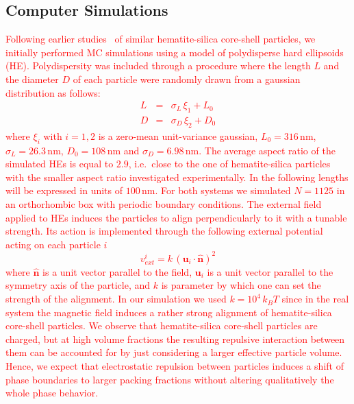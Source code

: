 \documentclass[aps,prl,preprint,superscriptaddress]{revtex4-1} %
\def\nm{\,\si{\nano\meter}}%
\begin{document}
\subsection{Computer Simulations}
 \textcolor{red}{Following earlier studies~\cite{martchenko2016anisotropic} of similar hematite-silica core-shell particles, we initially performed MC simulations
using a model of polydisperse hard ellipsoids (HE). Polydispersity was included through a procedure where the length $L$ and the diameter $D$ of each particle were randomly drawn from a gaussian distribution as follows:
\begin{eqnarray}
  L &=& \sigma_L\,\xi_1 + L_0\\
  D &=& \sigma_D\,\xi_2 + D_0
\end{eqnarray}
where $\xi_i$ with $i=1,2$ is a zero-mean unit-variance gaussian, $L_0=316 \nm$, $\sigma_L=26.3 \nm$, $D_0=108 \nm$ and $\sigma_D=6.98 \nm$. 
The average aspect ratio of the simulated HEs is equal to $2.9$, i.e.~close to the one of hematite-silica particles with the smaller aspect ratio investigated experimentally.  
In the following lengths will be expressed in units of $100\nm$. For both systems we simulated $N=1125$ in an orthorhombic box with periodic boundary conditions.
The external field applied to HEs induces the particles to align perpendicularly to it with a tunable strength.
Its action is implemented through the following external potential acting on each particle $i$
\begin{equation}
v_{ext}^i = k\, {( \mathbf{u}_i\cdot \hat{\mathbf{n}} )}^2
\end{equation}
where $\hat{\mathbf{n}}$ is a unit vector parallel to the field, $\mathbf{u}_i$ is a unit vector parallel to the symmetry axis of the particle,
and $k$ is parameter by which one can set the strength of the alignment. In our simulation we used $k=10^4\, k_B T$ since in the real
system the magnetic field induces a rather strong alignment of hematite-silica core-shell particles. We observe that hematite-silica core-shell particles are charged, but at high volume fractions the resulting repulsive interaction between them can be accounted for by just considering a larger effective particle volume. Hence, we expect that electrostatic repulsion between particles 
induces a shift of phase boundaries to larger packing fractions without altering qualitatively the whole phase behavior.}
\end{document}
